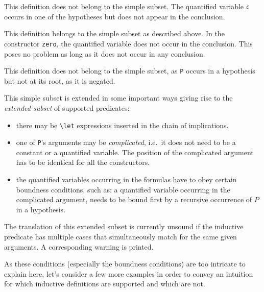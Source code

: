 \begin{example}[unsupported]
  This definition does not belong to the simple subset.
  The quantified variable \lstinline|c| occurs in one of the hypotheses but
  does not appear in the conclusion.
\end{example}

\begin{example}[supported]
  This definition belongs to the simple subset as described above.
  In the constructor \lstinline|zero|, the quantified variable does not
  occur in the conclusion. This poses no problem as long as it does not occur
  in any conclusion.
\end{example}

\begin{example}[unsupported]
  This definition does not belong to the simple subset, as \lstinline|P|
  occurs in a hypothesis but not at its root, as it is negated.
\end{example}

This simple subset is extended in some important ways giving rise to the
\emph{extended subset} of supported predicates:
\begin{itemize}
  \item there may be \lstinline|\let| expressions inserted in the chain of
    implications.
  \item one of \lstinline|P|'s arguments may be \emph{complicated}, i.e.\ it
    does not need to be a constant or a quantified variable. The position of
    the complicated argument has to be identical for all the constructors.
  \item the quantified variables occurring in the formulas have to obey
    certain boundness conditions, such as: a quantified variable occurring in
    the complicated argument, needs to be bound first by a recursive
    occurrence of $P$ in a hypothesis.
\end{itemize}

\begin{important}
  The translation of this extended subset is currently
  unsound if the inductive predicate has multiple cases that simultaneously
  match for the same given arguments. A corresponding warning is printed.
\end{important}

As these conditions (especially the boundness conditions) are too intricate to
explain here, let's consider a few more examples in order to convey an
intuition for which inductive definitions are supported and which are not.

